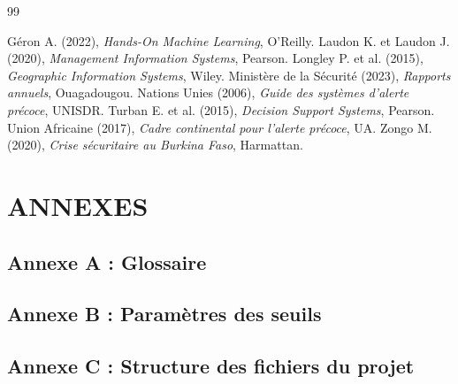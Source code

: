 \documentclass[12pt,a4paper]{article}
\begin{document}
\newpage
\begin{thebibliography}{99}
 Géron A. (2022), \emph{Hands-On Machine Learning}, O'Reilly.
 Laudon K. et Laudon J. (2020), \emph{Management Information Systems}, Pearson.
 Longley P. et al. (2015), \emph{Geographic Information Systems}, Wiley.
 Ministère de la Sécurité (2023), \emph{Rapports annuels}, Ouagadougou.
 Nations Unies (2006), \emph{Guide des systèmes d'alerte précoce}, UNISDR.
 Turban E. et al. (2015), \emph{Decision Support Systems}, Pearson.
 Union Africaine (2017), \emph{Cadre continental pour l'alerte précoce}, UA.
 Zongo M. (2020), \emph{Crise sécuritaire au Burkina Faso}, Harmattan.
\end{thebibliography}

\newpage
\appendix
\chapter*{ANNEXES}
\section*{Annexe A : Glossaire}
\section*{Annexe B : Paramètres des seuils}
\section*{Annexe C : Structure des fichiers du projet}
\end{document}
